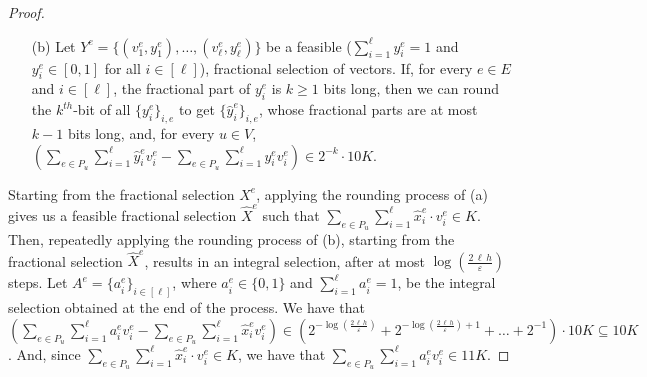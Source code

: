 \begin{proof}
\begin{enumerate}
        \item [(b)] 
            Let $Y^e = \{(v^e_1,y^e_1), \ldots, (v^e_{\ell},y^e_{\ell})\}$ be a feasible ($\sum_{i=1}^{\ell} y^e_i = 1$ and $y^e_i \in [0,1]$ for all $i \in [\ell]$), fractional selection of vectors. If, for every $e \in E$ and $i \in [\ell]$, the fractional part of $y^e_i$ is $k \geq 1$ bits long, then we can round the $k^{th}$-bit of all $\{y^e_i\}_{i,e}$ to get $\{\hat{y}^e_i\}_{i,e}$, whose fractional parts are at most $k-1$ bits long, and, for every $u \in V$, $\left( \sum_{e \in P_u} \sum_{i=1}^{\ell} \hat{y}^e_i v^e_i - \sum_{e \in P_u} \sum_{i=1}^{\ell} y^e_i v^e_i  \right) \in 2^{-k} \cdot 10 K$.
    \end{enumerate}

Starting from the fractional selection $X^e$, applying the rounding process of (a) gives us a feasible fractional selection $\hat{X}^e$ such that $\sum_{e \in P_u} \sum_{i=1}^{\ell} \hat{x}^e_i \cdot v^e_i \in K$. Then, repeatedly applying the rounding process of (b), starting from the fractional selection $\hat{X}^e$, results in an integral selection, after at most $\log(\frac{2 \, \ell \, h}{\varepsilon})$ steps. Let $A^e = \{ a^e_i \}_{i \in [\ell]}$, where $a^e_i \in \{ 0 , 1 \}$ and $\sum_{i=1}^\ell a^e_i = 1$, be the integral selection obtained at the end of the process. We have that $\left( \sum_{e \in P_u} \sum_{i=1}^{\ell} a^e_i v^e_i - \sum_{e \in P_u} \sum_{i=1}^{\ell} \hat{x}^e_i v^e_i  \right) \in \left( 2^{-\log(\frac{2 \, \ell \, h}{\varepsilon})} + 2^{-\log(\frac{2 \, \ell \, h}{\varepsilon})+1} + \dots + 2^{-1} \right) \cdot 10 K \subseteq 10 K$. And, since $\sum_{e \in P_u} \sum_{i=1}^{\ell} \hat{x}^e_i \cdot v^e_i \in K$, we have that $\sum_{e \in P_u} \sum_{i=1}^{\ell} a^e_i v^e_i \in 11 K$.


\end{proof}
